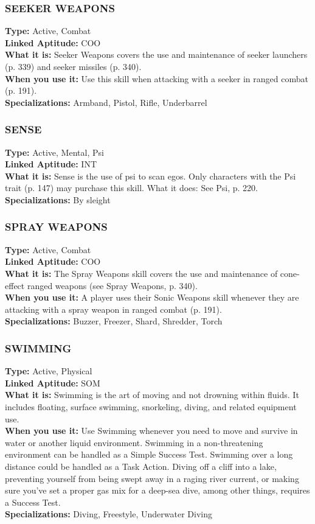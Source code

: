 \subsubsection{SEEKER WEAPONS}
\textbf{Type:} Active, Combat
\\ \textbf{Linked Aptitude:} COO
\\ \textbf{What it is:} Seeker Weapons covers the use and
maintenance of seeker launchers (p. 339) and seeker
missiles (p. 340).
\\ \textbf{When you use it:} Use this skill when attacking with
a seeker in ranged combat (p. 191).
\\ \textbf{Specializations:} Armband, Pistol, Rifle, Underbarrel

\subsubsection{SENSE}
\textbf{Type:} Active, Mental, Psi
\\ \textbf{Linked Aptitude:} INT
\\ \textbf{What it is:} Sense is the use of psi to scan egos. Only
characters with the Psi trait (p. 147) may purchase
this skill.
What it does: See Psi, p. 220.
\\ \textbf{Specializations:} By sleight

\subsubsection{SPRAY WEAPONS}
\textbf{Type:} Active, Combat
\\ \textbf{Linked Aptitude:} COO
\\ \textbf{What it is:} The Spray Weapons skill covers the use
and maintenance of cone-effect ranged weapons (see
Spray Weapons, p. 340).
\\ \textbf{When you use it:} A player uses their Sonic Weapons
skill whenever they are attacking with a spray weapon
in ranged combat (p. 191).
\\ \textbf{Specializations:} Buzzer, Freezer, Shard, Shredder, Torch

\subsubsection{SWIMMING}
\textbf{Type:} Active, Physical
\\ \textbf{Linked Aptitude:} SOM
\\ \textbf{What it is:} Swimming is the art of moving and
not drowning within fluids. It includes floating,
surface swimming, snorkeling, diving, and related
equipment use.
\\ \textbf{When you use it:} Use Swimming whenever you
need to move and survive in water or another liquid
environment. Swimming in a non-threatening environment can be handled as a Simple Success Test.
Swimming over a long distance could be handled as
a Task Action. Diving off a cliff into a lake, preventing yourself from being swept away in a raging river
current, or making sure you’ve set a proper gas mix
for a deep-sea dive, among other things, requires a
Success Test.
\\ \textbf{Specializations:} Diving, Freestyle, Underwater Diving

